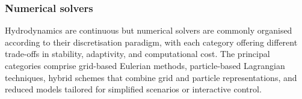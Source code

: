 

\subsubsection{Numerical solvers}

Hydrodynamics are continuous but numerical solvers are commonly organised according to their discretisation paradigm, with each category offering different trade-offs in stability, adaptivity, and computational cost. The principal categories comprise grid-based Eulerian methods, particle-based Lagrangian techniques, hybrid schemes that combine grid and particle representations, and reduced models tailored for simplified scenarios or interactive control.


